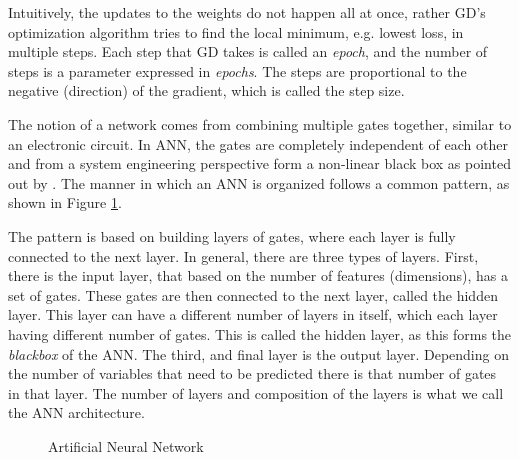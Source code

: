 \documentclass[11pt]{article}
\begin{document}
Intuitively, the updates to the weights do not happen all at once, rather GD's optimization algorithm tries to find the local minimum, e.g. lowest loss, in multiple steps. Each step that GD takes is called an \textit{epoch}, and the number of steps is a parameter expressed in \textit{epochs}. The steps are proportional to the negative (direction) of the gradient, which is called the step size.

The notion of a network comes from combining multiple gates together, similar to an electronic circuit. In ANN, the gates are completely independent of each other and from a system engineering perspective form a non-linear black box as pointed out by \citet{Prieto2016NeuralChallenges}. The manner in which an ANN is organized follows a common pattern, as shown in Figure \ref{fig:ann-diagram}.

The pattern is based on building layers of gates, where each layer is fully connected to the next layer. In general, there are three types of layers. First, there is the input layer, that based on the number of features (dimensions), has a set of gates. These gates are then connected to the next layer, called the hidden layer. This layer can have a different number of layers in itself, which each layer having different number of gates. This is called the hidden layer, as this forms the \textit{blackbox} of the ANN. The third, and final layer is the output layer. Depending on the number of variables that need to be predicted there is that number of gates in that layer. The number of layers and composition of the layers is what we call the ANN architecture.
\begin{figure}[!ht]
	\centering
	\caption{Artificial Neural Network}
	\label{fig:ann-diagram}
\end{figure}
\end{document}
